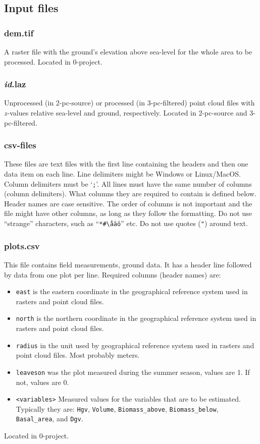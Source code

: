\documentclass[english,a4paper,minion,nofigsidecaption]{article}
\newcommand{\file}[1]{\textsf{#1}}
\renewcommand{\tt}[1]{\texttt{#1}}
\newcommand{\id}{\emph{id}}
\begin{document}
\subsection{Input files}

\subsubsection{dem.tif}
A raster file with the ground's elevation above sea-level for the whole area to be processed. 
Located in \file{0-project}.

\subsubsection{{\id}.laz}
Unprocessed (in \file{2-pc-source}) or processed (in \file{3-pc-filtered}) point cloud files with $z$-values relative sea-level and ground, respectively. 
Located in \file{2-pc-source} and \file{3-pc-filtered}.


\subsubsection{csv-files}

These files are text files with the first line containing the headers and then one data item on each line. Line delimiters might be Windows or Linux/MacOS. Column delimiters must be ‘\texttt{;}’. All lines must have the same number of columns (column delimiters). What columns they are required to contain is defined below. Header names are case sensitive. The order of columns is not important and the file might have other columns, as long as they follow the formatting. Do not use “strange” characters, such as “\verb|*#\åäö|” etc. Do not use quotes (\tt{"}) around text.

\subsubsection{plots.csv}
This file contains field measurements, ground data. It has a header line followed by data from one plot per line. Required columns (header names) are:
\begin{itemize}
	\item\tt{east} is the eastern coordinate in the geographical reference system used in rasters and point cloud files.
	\item\tt{north} is the northern coordinate in the geographical reference system used in rasters and point cloud files.
	\item\tt{radius} in the unit used by geographical reference system used in rasters and point cloud files. Most probably meters.
	\item\tt{leaveson} was the plot measured during the summer season, values are 1. If not, values are 0.
	\item\tt{<variables>} Measured values for the variables that are to be estimated. Typically they are: \tt{Hgv}, \tt{Volume}, \verb|Biomass_above|, \verb|Biomass_below|, \verb|Basal_area|, and \tt{Dgv}.
\end{itemize}
Located in \file{0-project}.
\end{document}
